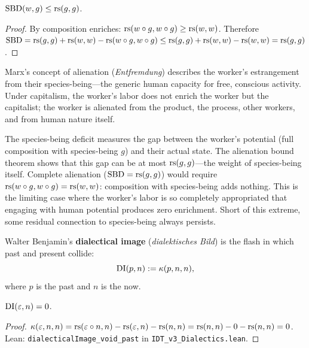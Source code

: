 \begin{theorem}
\label{thm:alienation-bound}
$\mathrm{SBD}(w, g) \leq \mathrm{rs}(g, g)$.
\end{theorem}

\begin{proof}
By composition enriches: $\mathrm{rs}(w \circ g, w \circ g) \geq \mathrm{rs}(w, w)$.
Therefore $\mathrm{SBD} = \mathrm{rs}(g, g) + \mathrm{rs}(w, w) - \mathrm{rs}(w \circ g,
w \circ g) \leq \mathrm{rs}(g, g) + \mathrm{rs}(w, w) - \mathrm{rs}(w, w) = \mathrm{rs}(g, g)$.
\end{proof}

\begin{interpretation}
\label{interp:alienation}
Marx's concept of alienation (\textit{Entfremdung}) describes the worker's
estrangement from their species-being---the generic human capacity for free,
conscious activity. Under capitalism, the worker's labor does not enrich the
worker but the capitalist; the worker is alienated from the product, the
process, other workers, and from human nature itself.

The species-being deficit measures the gap between the worker's potential
(full composition with species-being $g$) and their actual state. The
alienation bound theorem shows that this gap can be at most $\mathrm{rs}(g, g)$---the
weight of species-being itself. Complete alienation ($\mathrm{SBD} = \mathrm{rs}(g,g)$)
would require $\mathrm{rs}(w \circ g, w \circ g) = \mathrm{rs}(w, w)$: composition with
species-being adds nothing. This is the limiting case where the worker's
labor is so completely appropriated that engaging with human potential produces
zero enrichment. Short of this extreme, some residual connection to
species-being always persists.
\end{interpretation}

\begin{definition}
\label{def:dialectical-image}
Walter Benjamin's \textbf{dialectical image} (\textit{dialektisches Bild})
is the flash in which past and present collide:
\[
\mathrm{DI}(p, n) := \kappa(p, n, n),
\]
where $p$ is the past and $n$ is the now.
\end{definition}

\begin{theorem}
\label{thm:di-void}
$\mathrm{DI}(\varepsilon, n) = 0$.
\end{theorem}

\begin{proof}
$\kappa(\varepsilon, n, n) = \mathrm{rs}(\varepsilon \circ n, n) - \mathrm{rs}(\varepsilon, n) - \mathrm{rs}(n, n)
= \mathrm{rs}(n, n) - 0 - \mathrm{rs}(n, n) = 0$.
Lean: \texttt{dialecticalImage\_void\_past} in
\texttt{IDT\_v3\_Dialectics.lean}.
\end{proof}

